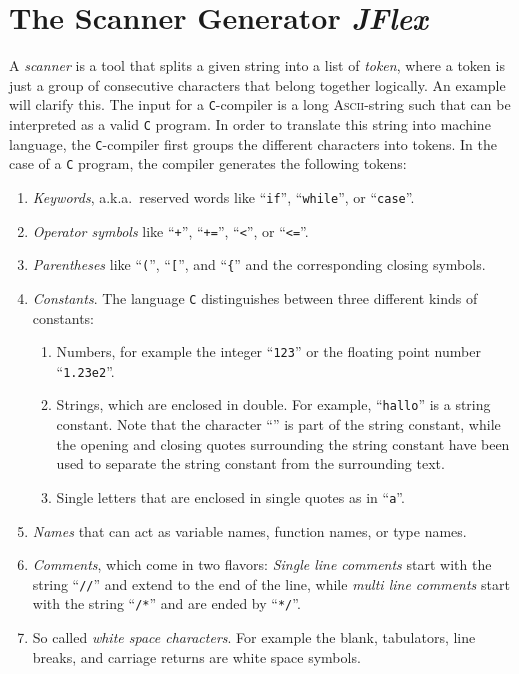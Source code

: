 \chapter{The Scanner Generator \textsl{JFlex}}
A  \emph{scanner} is a tool that splits a given string into a list of \emph{token}, where a token is
just a group of consecutive characters that belong together logically.  An example will clarify this.  
The input for a \texttt{C}-compiler is a long \textsc{Ascii}-string such that can be interpreted as a
valid \texttt{C} program.  In order to translate this string into machine language, the
\texttt{C}-compiler first groups the different characters into tokens.  In the case of a \texttt{C}
program, the compiler generates the following tokens:
\begin{enumerate}
\item \emph{Keywords}, a.k.a.~reserved words like ``\texttt{if}'', ``\texttt{while}'', or ``\texttt{case}''.
\item \emph{Operator symbols} like ``\texttt{+}'', ``\texttt{+=}'', ``\texttt{<}'', or
      ``\texttt{<=}''. 
\item \emph{Parentheses} like ``\texttt{(}'', ``\texttt{[}'', and ``\texttt{\{}'' and the
      corresponding closing symbols.
\item \emph{Constants}.  The language \texttt{C} distinguishes between three different kinds of constants:
      \begin{enumerate}
      \item Numbers, for example the integer ``\texttt{123}'' or the floating point number ``\texttt{1.23e2}''.
      \item Strings, which are enclosed in double.  For example,
            ``\texttt{hallo}'' is a string constant.  Note that the character
            ``\texttt{}'' is part of the string constant, while the opening and closing
            quotes surrounding the string constant have been used to separate the string constant
            from the surrounding text. 
      \item Single letters that are enclosed in single quotes as in
            ``\texttt{a}''.
      \end{enumerate}
\item \emph{Names} that can act as variable names, function names, or type names.
\item \emph{Comments}, which come in two flavors:  \emph{Single line comments} start with the string
      ``\texttt{//}'' and extend to the end of the line, while \emph{multi line comments} start with
      the string ``\texttt{/*}'' and are ended by ``\texttt{*/}''.
\item So called \emph{white space characters}.  For example the blank, tabulators, line breaks, and
      carriage returns are white space symbols.
\end{enumerate}

